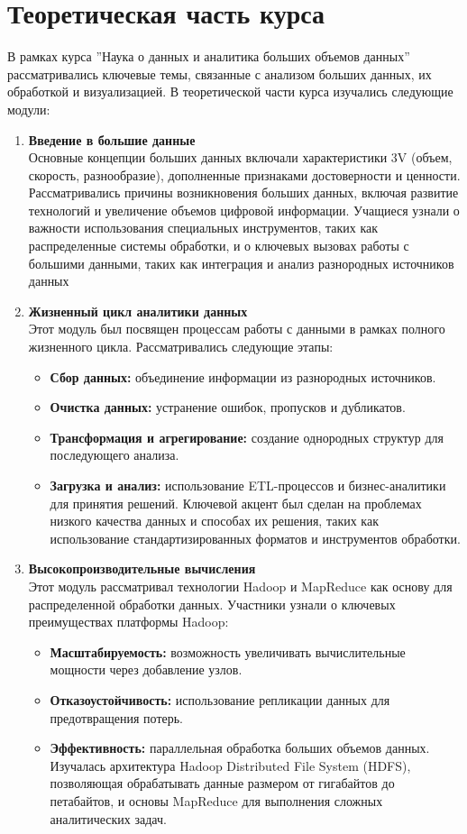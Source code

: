 \documentclass[a4paper, final]{article}
\begin{document}
\newpage
\section{Теоретическая часть курса}
В рамках курса ''Наука о данных и аналитика больших объемов данных'' рассматривались ключевые темы, связанные с анализом больших данных, их обработкой и визуализацией. В теоретической части курса изучались следующие модули:
\begin{enumerate}
  \item \textbf{Введение в большие данные}\\
Основные концепции больших данных включали характеристики 3V (объем, скорость, разнообразие), дополненные признаками достоверности и ценности. Рассматривались причины возникновения больших данных, включая развитие технологий и увеличение объемов цифровой информации. Учащиеся узнали о важности использования специальных инструментов, таких как распределенные системы обработки, и о ключевых вызовах работы с большими данными, таких как интеграция и анализ разнородных источников данных

  \item \textbf{Жизненный цикл аналитики данных}\\
Этот модуль был посвящен процессам работы с данными в рамках полного жизненного цикла. Рассматривались следующие этапы:
    \begin{itemize}
      \item \textbf{Сбор данных:} объединение информации из разнородных источников.
      \item \textbf{Очистка данных:} устранение ошибок, пропусков и дубликатов.
      \item \textbf{Трансформация и агрегирование:} создание однородных структур для последующего анализа.
      \item \textbf{Загрузка и анализ:} использование ETL-процессов и бизнес-аналитики для принятия решений. Ключевой акцент был сделан на проблемах низкого качества данных и способах их решения, таких как использование стандартизированных форматов и инструментов обработки.
    \end{itemize}

  \item \textbf{Высокопроизводительные вычисления}\\
Этот модуль рассматривал технологии Hadoop и MapReduce как основу для распределенной обработки данных. Участники узнали о ключевых преимуществах платформы Hadoop:
    \begin{itemize}
      \item \textbf{Масштабируемость:} возможность увеличивать вычислительные мощности через добавление узлов.
      \item \textbf{Отказоустойчивость:} использование репликации данных для предотвращения потерь.
      \item \textbf{Эффективность:} параллельная обработка больших объемов данных. Изучалась архитектура Hadoop Distributed File System (HDFS), позволяющая обрабатывать данные размером от гигабайтов до петабайтов, и основы MapReduce для выполнения сложных аналитических задач.
    \end{itemize}


\end{enumerate}
\end{document}
